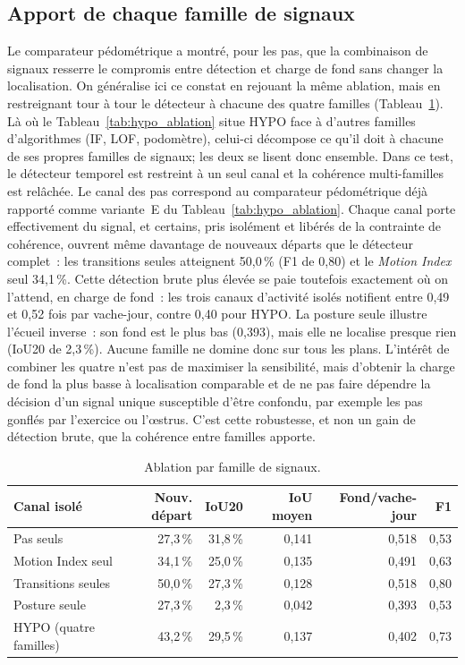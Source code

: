 \subsection{Apport de chaque famille de signaux}

Le comparateur pédométrique a montré, pour les pas, que la combinaison de signaux resserre le
compromis entre détection et charge de fond sans changer la localisation. On généralise ici ce
constat en rejouant la même ablation, mais en restreignant tour à tour le détecteur à chacune
des quatre familles (Tableau~\ref{tab:hypo_channels}). Là où le Tableau~\ref{tab:hypo_ablation}
situe HYPO face à d'autres familles d'algorithmes (IF, LOF, podomètre), celui-ci décompose ce
qu'il doit à chacune de ses propres familles de signaux; les deux se lisent donc ensemble.
Dans ce test, le détecteur temporel est restreint à un seul canal et la cohérence
multi-familles est relâchée. Le canal des pas correspond au comparateur pédométrique déjà
rapporté comme variante~E du Tableau~\ref{tab:hypo_ablation}.
Chaque canal porte effectivement du signal, et certains,
pris isolément et libérés de la contrainte de cohérence, ouvrent même davantage de nouveaux
départs que le détecteur complet~: les transitions seules atteignent 50,0\,\% (F1 de 0,80) et
le \textit{Motion Index} seul 34,1\,\%. Cette détection brute plus élevée se paie toutefois
exactement où on l'attend, en charge de fond~: les trois canaux d'activité isolés notifient
entre 0,49 et 0,52 fois par vache-jour, contre 0,40 pour HYPO. La posture seule illustre
l'écueil inverse~: son fond est le plus bas (0,393), mais elle ne localise presque rien
(IoU20 de 2,3\,\%). Aucune
famille ne domine donc sur tous les plans. L'intérêt de combiner les quatre n'est pas de
maximiser la sensibilité, mais d'obtenir la charge de fond la plus basse à localisation
comparable et de ne pas faire dépendre la décision d'un signal unique susceptible d'être
confondu, par exemple les pas gonflés par l'exercice ou l'œstrus. C'est cette robustesse, et
non un gain de détection brute, que la cohérence entre familles apporte.

\begin{table}[H]
  \centering
  \caption{Ablation par famille de signaux.}
  \label{tab:hypo_channels}
  \small
  \begin{tabular}{lrrrrr}
    \toprule
    Canal isolé & Nouv. départ & IoU20 & IoU moyen & Fond/vache-jour & F1 \\
    \midrule
    Pas seuls & 27,3\,\% & 31,8\,\% & 0,141 & 0,518 & 0,53 \\
    Motion Index seul & 34,1\,\% & 25,0\,\% & 0,135 & 0,491 & 0,63 \\
    Transitions seules & 50,0\,\% & 27,3\,\% & 0,128 & 0,518 & 0,80 \\
    Posture seule & 27,3\,\% & 2,3\,\% & 0,042 & 0,393 & 0,53 \\
    HYPO (quatre familles) & 43,2\,\% & 29,5\,\% & 0,137 & 0,402 & 0,73 \\
    \bottomrule
  \end{tabular}
\end{table}

